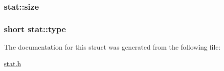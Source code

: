 \subsubsection[{\texorpdfstring{size}{size}}]{ stat\+::size}\hypertarget{structstat_a4ac15b64dd4d787c59a8a687d79adb35}{}\label{structstat_a4ac15b64dd4d787c59a8a687d79adb35}
\subsubsection[{\texorpdfstring{type}{type}}]{\setlength{\rightskip}{0pt plus 5cm}short stat\+::type}\hypertarget{structstat_a01f1b4cd7627d192a7875c9a188e0699}{}\label{structstat_a01f1b4cd7627d192a7875c9a188e0699}


The documentation for this struct was generated from the following file\+:\begin{DoxyCompactItemize}
\item 
\hyperlink{stat_8h}{stat.\+h}\end{DoxyCompactItemize}
